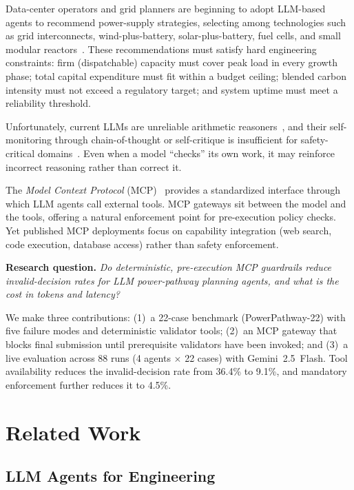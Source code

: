 \documentclass[conference]{IEEEtran}
\begin{document}
Data-center operators and grid planners are beginning to adopt LLM-based
agents to recommend power-supply strategies, selecting among technologies such
as grid interconnects, wind-plus-battery, solar-plus-battery, fuel cells,
and small modular reactors~\cite{iea2024datacenters}.  These recommendations
must satisfy hard engineering constraints: firm (dispatchable) capacity must
cover peak load in every growth phase; total capital expenditure must fit
within a budget ceiling; blended carbon intensity must not exceed a regulatory
target; and system uptime must meet a reliability threshold.

Unfortunately, current LLMs are unreliable arithmetic reasoners~\cite{frieder2023mathematical},
and their self-monitoring through chain-of-thought or self-critique
is insufficient for safety-critical domains~\cite{huang2023large}.
Even when a model ``checks'' its own work, it may reinforce incorrect
reasoning rather than correct it.

The \emph{Model Context Protocol} (MCP)~\cite{anthropic2024mcp} provides a
standardized interface through which LLM agents call external tools.  MCP
gateways sit between the model and the tools, offering a natural enforcement
point for pre-execution policy checks.  Yet published MCP deployments focus
on capability integration (web search, code execution, database access) rather
than safety enforcement.

\textbf{Research question.}  \textit{Do deterministic, pre-execution MCP
guardrails reduce invalid-decision rates for LLM power-pathway planning
agents, and what is the cost in tokens and latency?}

We make three contributions:
(1)~a 22-case benchmark (PowerPathway-22) with five failure modes
and deterministic validator tools;
(2)~an MCP gateway that blocks final submission until prerequisite validators
have been invoked; and
(3)~a live evaluation across 88 runs (4 agents $\times$ 22 cases) with
Gemini~2.5~Flash.  Tool availability reduces the invalid-decision rate
from 36.4\% to 9.1\%, and mandatory enforcement further reduces it to
4.5\%.


\section{Related Work}

\subsection{LLM Agents for Engineering}
\end{document}
